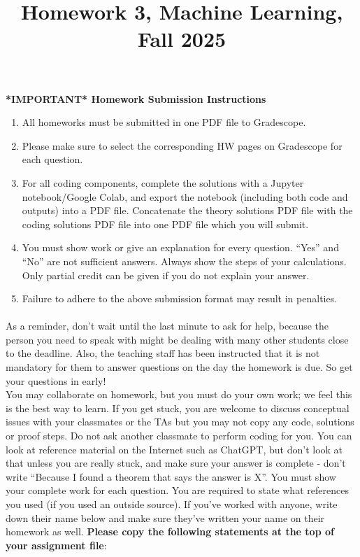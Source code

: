 \documentclass{exam}
\title{Homework 3, Machine Learning, Fall 2025}
\author{ }
\date{}
\begin{document}
\maketitle
\textbf{*IMPORTANT* Homework Submission Instructions}
\begin{enumerate}
    \item All homeworks must be submitted in one PDF file to Gradescope. 
    \item Please make sure to select the corresponding HW pages on Gradescope for each question.
    \item For all coding components, complete the solutions with a Jupyter notebook/Google Colab, and export the notebook (including both code and outputs) into a PDF file. Concatenate the theory solutions PDF file with the coding solutions PDF file into one PDF file which you will submit. 
    \item You must show work or give an explanation for every question. ``Yes'' and ``No'' are not sufficient answers. Always show the steps of your calculations. Only partial credit can be given if you do not explain your answer.
    \item Failure to adhere to the above submission format may result in penalties.  
\end{enumerate}

\paragraph{} As a reminder, don’t wait until the last minute to ask for help, because the person you need to speak with might be dealing with many other students close to the deadline. Also, the teaching staff has been instructed that it is not mandatory for them to answer questions on the day the homework is due. So get your questions in early! \\

You may collaborate on homework, but you must do your own work; we feel this is the best way to learn. If you get stuck, you are welcome to discuss conceptual issues with your classmates or the TAs but you may not copy any code, solutions or proof steps. Do not ask another classmate to perform coding for you. You can look at reference material on the Internet such as ChatGPT, but don’t look at that unless you are really stuck, and make sure your answer is complete - don’t write “Because I found a theorem that says the answer is X”. You must show your complete work for each question. You are required to state what references you used (if you used an outside source). If you've worked with anyone, write down their name below and make sure they've written your name on their homework as well. \textbf{Please copy the following statements at the top of your assignment file}: \\
\end{document}

